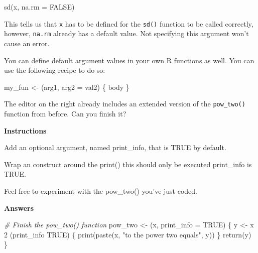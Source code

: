 \documentclass[]{article}
\newcommand{\hlnum}[1]{\textcolor[rgb]{0.816,0.125,0.439}{#1}}%
\newcommand{\hlstr}[1]{\textcolor[rgb]{0.251,0.627,0.251}{#1}}%
\newcommand{\hlcom}[1]{\textcolor[rgb]{0.502,0.502,0.502}{\textit{#1}}}%
\newcommand{\hlstd}[1]{\textcolor[rgb]{0.251,0.251,0.251}{#1}}%
\newcommand{\hlkwc}[1]{\textcolor[rgb]{0.251,0.251,0.251}{#1}}%
\newcommand{\hlkwd}[1]{\textcolor[rgb]{0.878,0.439,0.125}{#1}}%
\newenvironment{Shaded}{\begin{myshaded}}{\end{myshaded}}
\newcommand{\KeywordTok}[1]{\hlkwd{#1}}
\newcommand{\DataTypeTok}[1]{\hlkwc{#1}}
\newcommand{\DecValTok}[1]{\hlnum{#1}}
\newcommand{\StringTok}[1]{\hlstr{#1}}
\newcommand{\CommentTok}[1]{\hlcom{#1}}
\newcommand{\OtherTok}[1]{{#1}}
\newcommand{\NormalTok}[1]{\hlstd{#1}}
\begin{document}
\begin{Shaded}
\begin{Highlighting}[]
\KeywordTok{sd}\NormalTok{(x, }\DataTypeTok{na.rm =} \OtherTok{FALSE}\NormalTok{)}
\end{Highlighting}
\end{Shaded}

This tells us that \texttt{x} has to be defined for the \texttt{sd()}
function to be called correctly, however, \texttt{na.rm} already has a
default value. Not specifying this argument won't cause an error.

You can define default argument values in your own R functions as well.
You can use the following recipe to do so:

\begin{Shaded}
\begin{Highlighting}[]
\NormalTok{my_fun <-}\StringTok{ }\NormalTok{(arg1, }\DataTypeTok{arg2 =}\NormalTok{ val2) \{}
\NormalTok{body}
\NormalTok{\}}
\end{Highlighting}
\end{Shaded}

The editor on the right already includes an extended version of the
\texttt{pow\_two()} function from before. Can you finish it?

\textbf{Instructions}

\begin{Shaded}
\begin{Highlighting}[]

\OperatorTok{*}\StringTok{ }\NormalTok{Add an optional argument, named print_info, that is }\OtherTok{TRUE}\NormalTok{ by default.}

\OperatorTok{*}\StringTok{ }\NormalTok{Wrap an }\NormalTok{ construct around the }\KeywordTok{print}\NormalTok{() }\OperatorTok{:}\StringTok{ }\NormalTok{this }\NormalTok{ should only be executed }\NormalTok{ print_info is TRUE.}

\OperatorTok{*}\StringTok{ }\NormalTok{Feel free to experiment with the }\KeywordTok{pow_two}\NormalTok{() }\NormalTok{ you}\StringTok{'ve just coded.}
\end{Highlighting}
\end{Shaded}

\textbf{Answers}

\begin{Shaded}
\begin{Highlighting}[]
\CommentTok{# Finish the pow_two() function}
\NormalTok{pow_two <-}\StringTok{ }\NormalTok{(x, }\DataTypeTok{print_info =} \OtherTok{TRUE}\NormalTok{) \{}
\NormalTok{y <-}\StringTok{ }\NormalTok{x }\OperatorTok{^}\StringTok{ }\DecValTok{2}
\NormalTok{(print_info }\OperatorTok{==}\StringTok{ }\OtherTok{TRUE}\NormalTok{) \{}
\KeywordTok{print}\NormalTok{(}\KeywordTok{paste}\NormalTok{(x, }\StringTok{"to the power two equals"}\NormalTok{, y))}
\NormalTok{\}}
\KeywordTok{return}\NormalTok{(y)}
\NormalTok{\}}
\end{Highlighting}
\end{Shaded}
\end{document}
